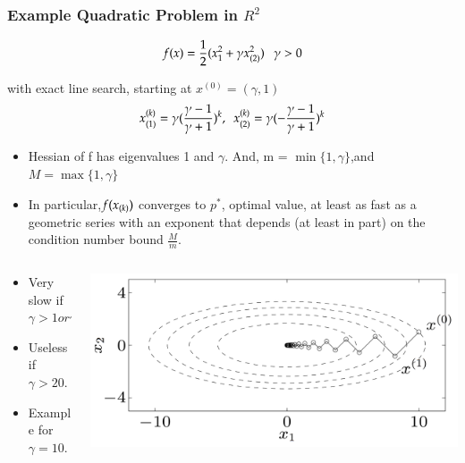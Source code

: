 \begin{frame}
  \frametitle{Example Quadratic Problem in $R^2$}

{
\tiny

$$f(x) = \frac{1}{2}(x_1^2 + \gamma x_{(2)}^2) ~~~ \gamma > 0$$

with exact line search, starting at $x^{(0)} = (\gamma, 1)$
$$x_{(1)}^{(k)} = \gamma (\frac{\gamma - 1}{\gamma + 1})^k, ~~
x_{(2)}^{(k)} = \gamma (-\frac{\gamma - 1}{\gamma + 1})^k$$
}
\vspace{-8mm}

{
\tiny
\begin{itemize}
\item Hessian of f has eigenvalues 1 and $\gamma$. And, m = $\min\{1,
    \gamma\}$,and $M = \max\{1, \gamma\}$
\item In particular,$f(x_{(k)})$ converges to $p^*$, optimal value, at
  least as fast as a geometric series with an exponent that depends
  (at least in part) on the condition number bound $\frac{M}{m}$.

\end{itemize}


}
\begin{columns}

  \begin{column}{0.6\textwidth}


\begin{itemize}
\item Very slow if $\gamma > 1 or \gamma < 1$
\item Useless if $\gamma > 20$.
\item Example for $\gamma = 10$.
\end{itemize}
\end{column}

\begin{column}{0.5\textwidth}
\includegraphics[scale=0.12, center]{pics/example.png}
\end{column}


\end{columns}
\end{frame}


